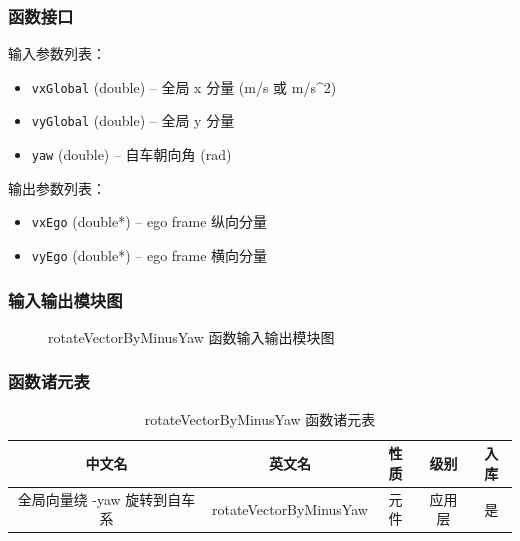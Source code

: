 \documentclass[a4paper,10pt]{article}
\begin{document}
\subsubsection{函数接口}
\par 输入参数列表：
\begin{itemize}
  \item \texttt{vxGlobal} (double) -- 全局 x 分量 (m/s 或 m/s\textasciicircum{}2)
  \item \texttt{vyGlobal} (double) -- 全局 y 分量
  \item \texttt{yaw} (double) -- 自车朝向角 (rad)
\end{itemize}
\par 输出参数列表：
\begin{itemize}
  \item \texttt{vxEgo} (double*) -- ego frame 纵向分量
  \item \texttt{vyEgo} (double*) -- ego frame 横向分量
\end{itemize}
\subsubsection{输入输出模块图}
\begin{figure}[h]
    \centering
    \caption{rotateVectorByMinusYaw 函数输入输出模块图}
    \label{fig:io_rotateVectorByMinusYaw}
\end{figure}
\subsubsection{函数诸元表}
\begin{table}[h]
    \centering
    \caption{rotateVectorByMinusYaw 函数诸元表}
    \label{tab:meta_rotateVectorByMinusYaw}
    \begin{tabular}{|c|c|c|c|c|}
        \hline
        中文名 & 英文名 & 性质 & 级别 & 入库 \\ \hline
        全局向量绕 -yaw 旋转到自车系 & rotateVectorByMinusYaw & 元件 & 应用层 & 是 \\ \hline
    \end{tabular}
\end{table}
\end{document}
